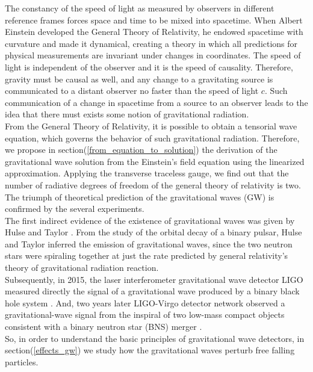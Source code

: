The constancy of the speed of light as measured by observers in different reference frames forces space and time to be mixed into spacetime.
When Albert Einstein developed the General Theory of Relativity, he endowed spacetime with curvature and made it dynamical, creating a theory in which all predictions for physical measurements are invariant under changes in coordinates.
The speed of light is independent of the observer and it is the speed of causality.
Therefore, gravity must be causal as well, and
any change to a gravitating source is communicated to a distant observer no faster than the speed of light $c$.
Such communication of a change in spacetime from a source to an observer leads to the idea that there must exists some notion of gravitational radiation.\\
From the General Theory of Relativity, it is possible to obtain a tensorial wave equation, which governs the behavior of such gravitational radiation.
Therefore, we propose in  section(\ref{from_equation_to_solution}) the derivation of the gravitational wave solution from the Einstein's field equation using the linearized approximation.
Applying the transverse traceless gauge, we find out that the number of radiative degrees of freedom of the general theory of relativity is two.\\
The triumph of theoretical prediction of the gravitational waves (GW) is confirmed by the several experiments.\\
The first indirect evidence of the existence of gravitational waves was given by Hulse and Taylor \cite{weisberg_relativistic_2004,weisberg_timing_2010}. 
From the study of the orbital decay of a binary pulsar, Hulse and Taylor inferred the emission of gravitational waves, since the two neutron stars were spiraling together at just the rate predicted by general relativity’s theory of gravitational radiation reaction.\\
Subsequently, in 2015, the laser interferometer gravitational wave detector LIGO measured directly the signal of a gravitational wave produced by a binary black hole system \cite{abbott_observation_2016}.
And, two years later LIGO-Virgo detector network observed a gravitational-wave signal from the inspiral of two low-mass compact objects consistent with a binary neutron star (BNS) merger \cite{abbott_gw170817:_2017}.\\
So, in order to understand the basic principles of gravitational wave detectors, in section(\ref{effects_gw}) we study how the gravitational waves perturb free falling particles.\\
